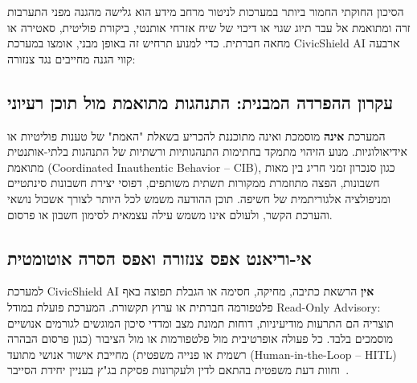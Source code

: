 הסיכון החוקתי החמור ביותר במערכות לניטור מרחב מידע הוא גלישה מהגנה מפני התערבות זרה ומתואמת אל עבר תיוג שגוי או דיכוי של שיח אזרחי אותנטי, ביקורת פוליטית, סאטירה או מחאה חברתית. כדי למנוע תרחיש זה באופן מבני, אומצו במערכת \textenglish{CivicShield AI} ארבעה קווי הגנה מחייבים נגד צנזורה:

\subsection{עקרון ההפרדה המבנית: התנהגות מתואמת מול תוכן רעיוני}
המערכת \textbf{אינה} מוסמכת ואינה מתוכננת להכריע בשאלת "האמת" של טענות פוליטיות או אידיאולוגיות. מנוע הזיהוי מתמקד בחתימות התנהגותיות ורשתיות של התנהגות בלתי-אותנטית מתואמת (\textenglish{Coordinated Inauthentic Behavior -- CIB}), כגון סנכרון זמני חריג בין מאות חשבונות, הפצה מתוזמרת ממקורות תשתית משותפים, דפוסי יצירת חשבונות סינתטיים ומניפולציה אלגוריתמית של חשיפה. תוכן ההודעה משמש לכל היותר לצורך אשכול נושאי והערכת הקשר, ולעולם אינו משמש עילה עצמאית לסימון חשבון או פרסום.

\subsection{אי-וריאנט אפס צנזורה ואפס הסרה אוטומטית}
למערכת \textenglish{CivicShield AI} \textbf{אין} הרשאת כתיבה, מחיקה, חסימה או הגבלת תפוצה באף פלטפורמה חברתית או ערוץ תקשורת. המערכת פועלת במודל \textenglish{Read-Only Advisory}: תוצריה הם התרעות מודיעיניות, דוחות תמונת מצב ומדדי סיכון המוגשים לגורמים אנושיים מוסמכים בלבד. כל פעולה אופרטיבית מול פלטפורמות או מול הציבור (כגון פרסום הבהרה רשמית או פנייה משפטית) מחייבת אישור אנושי מתועד (\textenglish{Human-in-the-Loop -- HITL}) וחוות דעת משפטית בהתאם לדין ולעקרונות פסיקת בג"ץ בעניין יחידת הסייבר~\cite{adalah2021cyber}.

